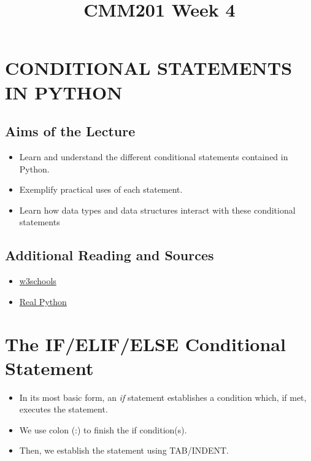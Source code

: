 \documentclass[11pt]{article}
\title{CMM201 Week 4}
\date{}
\providecommand{\tightlist}{%
      \setlength{\itemsep}{0pt}\setlength{\parskip}{0pt}}
\begin{document}
    
    
    \maketitle
    
   


    \hypertarget{conditional-statements-in-python}{%
\section{CONDITIONAL STATEMENTS IN
PYTHON}\label{conditional-statements-in-python}}

    \hypertarget{aims-of-the-lecture}{%
\subsection{Aims of the Lecture}\label{aims-of-the-lecture}}

\begin{itemize}
\tightlist
\item
  Learn and understand the different conditional statements contained in
  Python.
\item
  Exemplify practical uses of each statement.
\item
  Learn how data types and data structures interact with these
  conditional statements
\end{itemize}

    \hypertarget{additional-reading-and-sources}{%
\subsection{Additional Reading and
Sources}\label{additional-reading-and-sources}}

\begin{itemize}
\tightlist
\item
  \href{https://www.w3schools.com/python/python_for_loops.asp}{w3schools}
\item
  \href{https://realpython.com/python-conditional-statements/}{Real
  Python}
\end{itemize}

    \hypertarget{the-ifelifelse-conditional-statement}{%
\section{The IF/ELIF/ELSE Conditional
Statement}\label{the-ifelifelse-conditional-statement}}

    \begin{itemize}
\tightlist
\item
  In its most basic form, an \emph{if} statement establishes a condition
  which, if met, executes the statement.
\item
  We use colon (:) to finish the if condition(s).
\item
  Then, we establish the statement using TAB/INDENT.
\end{itemize}
\end{document}
